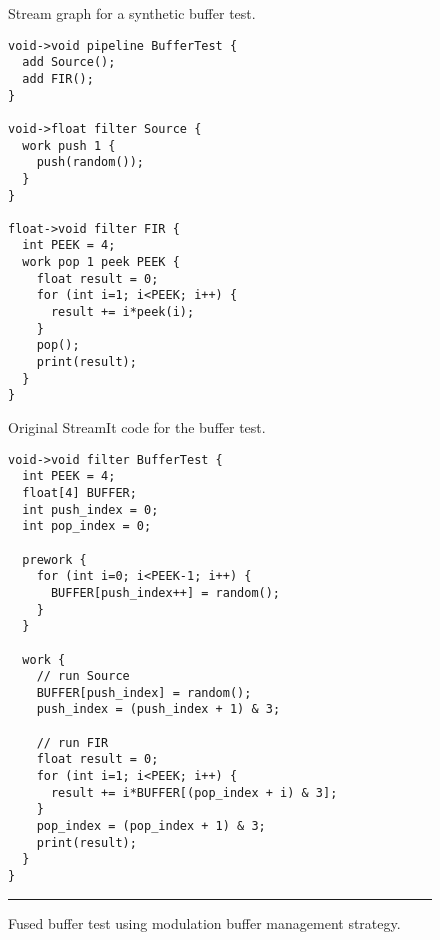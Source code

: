 \begin{figure*}[t]
\begin{minipage}{1.7in}
\centering
{}

\caption{Stream graph for a synthetic buffer test.\protect\label{fig:code-graph}}
\end{minipage}
\hspace{0.3in}
\begin{minipage}{2.2in}
\centering
{\scriptsize
\begin{verbatim}
void->void pipeline BufferTest {
  add Source();
  add FIR();
}

void->float filter Source {
  work push 1 {
    push(random());
  }
}

float->void filter FIR {
  int PEEK = 4;
  work pop 1 peek PEEK {
    float result = 0;
    for (int i=1; i<PEEK; i++) {
      result += i*peek(i);
    }
    pop();
    print(result);
  }
}
\end{verbatim}}

\caption{Original StreamIt code for the buffer test.\protect\label{fig:code-orig}}
\end{minipage}
\hspace{0.3in}
%
\begin{minipage}{2.2in}
\centering
{\scriptsize
\begin{verbatim}
void->void filter BufferTest {
  int PEEK = 4;
  float[4] BUFFER;
  int push_index = 0;
  int pop_index = 0;

  prework {
    for (int i=0; i<PEEK-1; i++) {
      BUFFER[push_index++] = random();
    }
  }

  work {
    // run Source
    BUFFER[push_index] = random();
    push_index = (push_index + 1) & 3;
    
    // run FIR
    float result = 0;
    for (int i=1; i<PEEK; i++) {
      result += i*BUFFER[(pop_index + i) & 3];
    }
    pop_index = (pop_index + 1) & 3;
    print(result);
  }
}
\end{verbatim}}

\caption{Fused buffer test using modulation buffer management strategy.\protect\label{fig:code-modulation}}
\end{minipage}
\vspace{6pt}
\hrule
\end{figure*}
